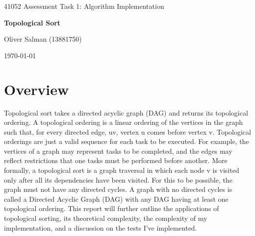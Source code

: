 \documentclass[12pt]{article}
\begin{document}
\begin{titlepage}
    \centering
   
    {\LARGE 41052 Assessment Task 1: Algorithm Implementation\par}
    
    \vspace{1cm}
    
    {\Large\bfseries Topological Sort \par}
    
    \vspace{1cm}

    {\large Oliver Salman (13881750)\par}
    
    \vspace{1cm}

    {\large \today\par}
\end{titlepage}

\section{Overview}
Topological sort takes a directed acyclic graph (DAG) and returns its topological ordering. A topological ordering is a linear ordering of the vertices in the graph such that, for every directed edge, uv, vertex u comes before vertex v. Topological orderings are just a valid sequence for each task to be executed. For example, the vertices of a graph may represent tasks to be completed, and the edges may reflect restrictions that one tasks must be performed before another. More formally, a topological sort is a graph traversal in which each node v is visited only after all its dependencies have been visited. For this to be possible, the graph must not have any directed cycles. A graph with no directed cycles is called a Directed Acyclic Graph (DAG) with any DAG having at least one topological ordering. This report will further outline the applications of topological sorting, its theoretical complexity, the complexity of my implementation, and a discussion on the tests I've implemented.
\end{document}
